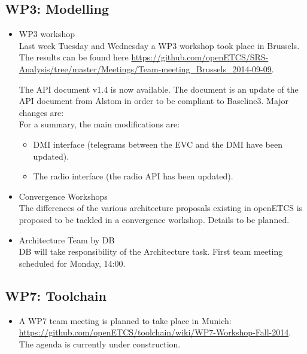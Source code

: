 \documentclass[a4paper, 11pt]{article}
\begin{document}
\subsection{WP3: Modelling}
\begin{itemize}

\item WP3 workshop\\
Last week Tuesday and Wednesday a WP3 workshop took place in Brussels. The results can be found here \url{https://github.com/openETCS/SRS-Analysis/tree/master/Meetings/Team-meeting_Brussels_2014-09-09}.

The API document v1.4 is now available. The document is an update of the API document from Alstom in order to be compliant to Baseline3. Major changes are: \\
For a summary, the main modifications are:
\begin{itemize}
\item DMI interface (telegrams between the EVC and the DMI have been updated).
\item The radio interface (the radio API has been updated).
\end{itemize}
 
\item Convergence Workshops\\
The differences of the various architecture proposals existing in openETCS is proposed to be tackled in a convergence workshop. Details to be planned.

\item Architecture Team by DB\\
DB will take responsibility of the Architecture task. First team meeting scheduled for Monday, 14:00.

\end{itemize}

\subsection{WP7: Toolchain}

\begin{itemize}
\item A WP7 team meeting is planned to take place in Munich: \url{https://github.com/openETCS/toolchain/wiki/WP7-Workshop-Fall-2014}. The agenda is currently under construction.
\end{itemize}
\end{document}
